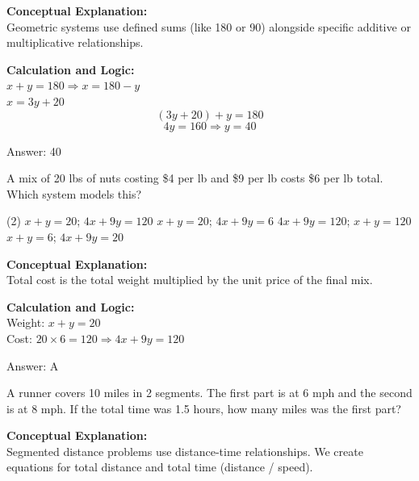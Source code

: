 \documentclass[11pt,paper=a4,answers]{exam}
\begin{document}
\begin{questions}
\begin{solution}
\textbf{Conceptual Explanation:} \\
Geometric systems use defined sums (like 180 or 90) alongside specific additive or multiplicative relationships.

\vspace{10pt}
\textbf{Calculation and Logic:} \\
$x + y = 180 \Rightarrow x = 180 - y$ \\
$x = 3y + 20$ \\
\[(3y + 20) + y = 180\]
\[4y = 160 \Rightarrow y = 40\]

\vspace{15pt}
Answer: \colorbox{yellow!100}{40}
\end{solution}

\question
A mix of 20 lbs of nuts costing \$4 per lb and \$9 per lb costs \$6 per lb total. Which system models this?
\begin{tasks}(2)
    \task $x + y = 20$; $4x + 9y = 120$
    \task $x + y = 20$; $4x + 9y = 6$
    \task $4x + 9y = 120$; $x + y = 120$
    \task $x + y = 6$; $4x + 9y = 20$
\end{tasks}

\begin{solution}
\textbf{Conceptual Explanation:} \\
Total cost is the total weight multiplied by the unit price of the final mix.

\vspace{10pt}
\textbf{Calculation and Logic:} \\
Weight: $x + y = 20$ \\
Cost: $20 \times 6 = 120 \Rightarrow 4x + 9y = 120$

\vspace{15pt}
Answer: \colorbox{yellow!100}{A}
\end{solution}

\question
A runner covers 10 miles in 2 segments. The first part is at 6 mph and the second is at 8 mph. If the total time was 1.5 hours, how many miles was the first part?

\begin{solution}
\textbf{Conceptual Explanation:} \\
Segmented distance problems use distance-time relationships. We create equations for total distance and total time (distance / speed).


\end{solution}
\end{questions}
\end{document}
